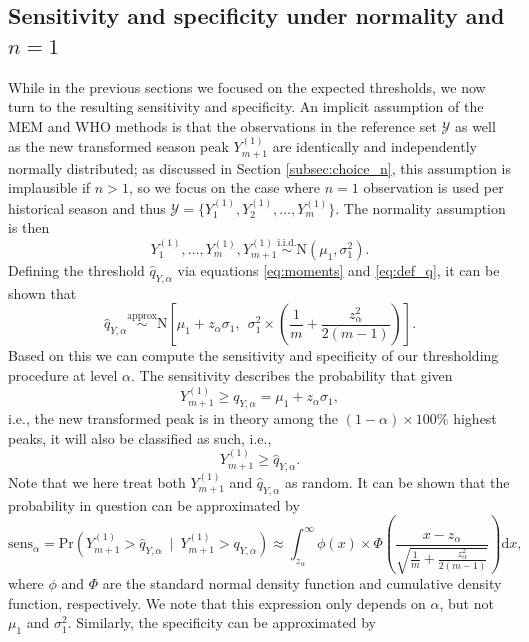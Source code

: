 \documentclass{article}
\begin{document}
\subsection{Sensitivity and specificity under normality and $n = 1$}
\label{subsec:theory_sensitivity}

While in the previous sections we focused on the expected thresholds, we now turn to the resulting sensitivity and specificity. An implicit assumption of the MEM and WHO methods is that the observations in the reference set $\mathcal{Y}$ as well as the new transformed season peak $Y_{m + 1}^{(1)}$ are identically and independently normally distributed; as discussed in Section \ref{subsec:choice_n}, this assumption is implausible if $n > 1$, so we focus on the case where $n = 1$ observation is used per historical season and thus $\mathcal{Y} = \{Y_1^{(1)}, Y_2^{(1)}, \dots, Y_m^{(1)}\}$. The normality assumption is then
$$
Y_1^{(1)}, \dots, Y_m^{(1)}, Y_{m + 1}^{(1)} \stackrel{\text{i.i.d.}}{\sim} \text{N}(\mu_1, \sigma^2_1).
$$
Defining the threshold $\hat{q}_{Y, \alpha}$ via equations \eqref{eq:moments} and \eqref{eq:def_q}, it can be shown that
\begin{equation}
\hat{q}_{Y, \alpha} \stackrel{\text{approx}}{\sim} \text{N}\left[\mu_1 + z_\alpha \sigma_1,\ \ \sigma_1^2 \times \left(\frac{1}{m} + \frac{z_\alpha^2}{2(m - 1)} \right) \right].
\label{eq:q_Y}
\end{equation}
Based on this we can compute the sensitivity and specificity of our thresholding procedure at level $\alpha$. The sensitivity describes the probability that given
$$
Y_{m + 1}^{(1)} \geq q_{Y, \alpha} = \mu_1 + z_\alpha \sigma_1,
$$
i.e., the new transformed peak is in theory among the $(1 - \alpha) \times 100\%$ highest peaks, it will also be classified as such, i.e.,
$$
Y_{m + 1}^{(1)} \geq \hat{q}_{Y, \alpha}.
$$
Note that we here treat both $Y_{m + 1}^{(1)}$ and $\hat{q}_{Y, \alpha}$ as random. It can be shown that the probability in question can be approximated by
\begin{equation}
\text{sens}_\alpha = \text{Pr}(Y_{m + 1}^{(1)} > \hat{q}_{Y, \alpha} \ \mid \ Y_{m + 1}^{(1)} > q_{Y, \alpha}) \approx \int_{z_\alpha}^\infty \phi(x) \times \Phi\left(\frac{x - z_\alpha}{\sqrt{\frac{1}{m} + \frac{z_\alpha^2}{2(m - 1)}}}\right) \text{d}x,
\label{eq:sens}
\end{equation}
where $\phi$ and $\Phi$ are the standard normal density function and cumulative density function, respectively. We note that this expression only depends on $\alpha$, but not $\mu_1$ and $\sigma^2_1$. Similarly, the specificity can be approximated by
\end{document}
